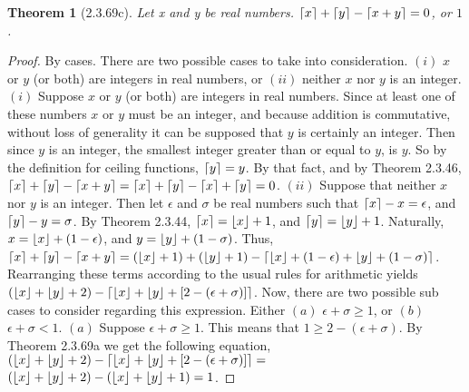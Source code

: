 \documentclass[a4paper, 12pt]{article}
\theoremstyle{plain}
\newtheorem*{theorem*}{Theorem}
\DeclarePairedDelimiter{\floor}{\lfloor}{\rfloor}
\DeclarePairedDelimiter{\ceil}{\lceil}{\rceil}
\begin{document}
	\begin{theorem*}[2.3.69c]
		Let x and y be real numbers. \newline $\ceil{x} + \ceil{y} - \ceil{x + y} = 0$, or $1$.		
	\end{theorem*}
	
	\begin{proof}
		By cases. There are two possible cases to take into consideration. \newline $(i)$ $x$ or 
		$y$ (or both) are integers in real numbers, or $(ii)$ neither $x$ nor $y$ is an integer.
		\newline
		\newline
		$(i)$ Suppose $x$ or $y$ (or both) are integers in real numbers. Since at least one of 
		these numbers $x$ or $y$ must be an integer, and because addition is commutative, without 
		loss of generality it can be supposed that $y$ is certainly an integer.	Then since $y$ is 
		an integer, the smallest integer greater than or equal to $y$, is $y$. So by the 
		definition for ceiling functions, $\ceil{y} = y$. By that fact, and by Theorem 2.3.46, 
		$\ceil{x} + \ceil{y} - \ceil{x + y} = \ceil{x} + \ceil{y} - \ceil{x} + \ceil{y} = 0$.
		\newline
		\newline
		$(ii)$ Suppose that neither $x$ nor $y$ is an integer. Then let $\epsilon$ and $\sigma$ be 
		real numbers such that $\ceil{x} - x = \epsilon$, and $\ceil{y} - y = \sigma$. By Theorem 
		2.3.44, $\ceil{x} = \floor{x} + 1$, and $\ceil{y} = \floor{y} + 1$. Naturally, 
		$x = \floor{x} + (1 - \epsilon)$, and $y = \floor{y} + (1 - \sigma)$. Thus, 
		$\ceil{x} + \ceil{y} - \ceil{x + y} = 
		(\floor{x}+1) + (\floor{y}+1) - \ceil{\floor{x} + (1 - \epsilon) + \floor{y} + (1 - \sigma)}$. 
		Rearranging these terms according to the usual rules for arithmetic yields 
		$(\floor{x} + \floor{y} + 2) - \ceil{\floor{x} + \floor{y} + [2 - (\epsilon + \sigma)]}$. 
		Now, there are two possible sub cases to consider regarding this expression. Either 
		$(a)$ $\epsilon + \sigma \ge 1$, or $(b)$ $\epsilon + \sigma < 1$.
		\newline
		\newline
		\indent $(a)$ Suppose 
		$\epsilon + \sigma \ge 1$. This means that $1 \ge 2 - (\epsilon + \sigma)$. By  \newline 
		\indent Theorem 2.3.69a we get the following equation, \newline \indent 
		$(\floor{x} + \floor{y} + 2) - \ceil{\floor{x} + \floor{y} + [2 - (\epsilon + \sigma)]} =$ 
		\newline \indent $(\floor{x} + \floor{y} + 2) - (\floor{x} + \floor{y} + 1) = 1$.

\end{proof}
\end{document}
